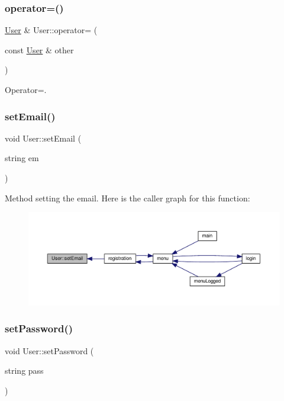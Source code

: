 \subsubsection{\texorpdfstring{operator=()}{operator=()}}
{\footnotesize\ttfamily \hyperlink{class_user}{User} \& User\+::operator= (\begin{DoxyParamCaption}\item[{const \hyperlink{class_user}{User} \&}]{other }\end{DoxyParamCaption})}

Operator=. \mbox{\label{class_user_a79486f90c900c5dfc272f0ad9a204c95}} 
\subsubsection{\texorpdfstring{set\+Email()}{setEmail()}}
{\footnotesize\ttfamily void User\+::set\+Email (\begin{DoxyParamCaption}\item[{string}]{em }\end{DoxyParamCaption})}

Method setting the email. Here is the caller graph for this function\+:\nopagebreak
\begin{figure}[H]
\begin{center}
\leavevmode
\includegraphics[width=350pt]{class_user_a79486f90c900c5dfc272f0ad9a204c95_icgraph}
\end{center}
\end{figure}
\mbox{\label{class_user_ab8d3c965902b378fc3472b388a97d56d}} 
\subsubsection{\texorpdfstring{set\+Password()}{setPassword()}}
{\footnotesize\ttfamily void User\+::set\+Password (\begin{DoxyParamCaption}\item[{string}]{pass }\end{DoxyParamCaption})}

